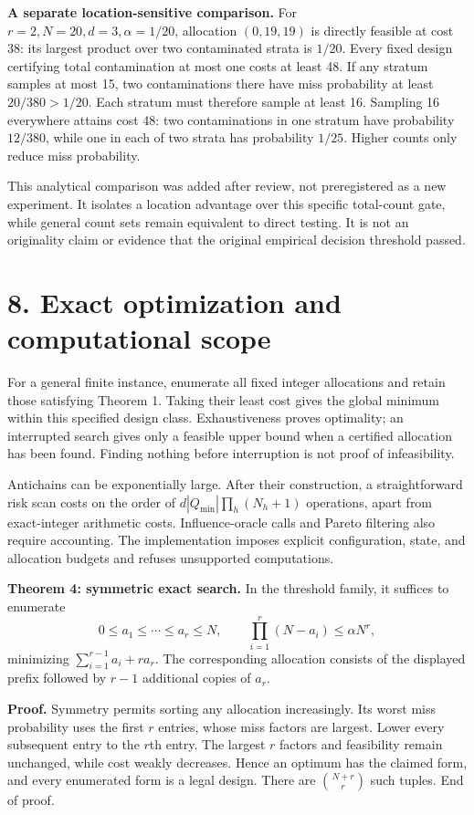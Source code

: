 \documentclass[11pt]{article}
\begin{document}
\textbf{A separate location-sensitive comparison.} For $r=2,N=20,d=3,\alpha=1/20$, allocation $(0,19,19)$ is directly feasible at cost 38: its largest product over two contaminated strata is $1/20$. Every fixed design certifying total contamination at most one costs at least 48. If any stratum samples at most 15, two contaminations there have miss probability at least $20/380>1/20$. Each stratum must therefore sample at least 16. Sampling 16 everywhere attains cost 48: two contaminations in one stratum have probability $12/380$, while one in each of two strata has probability $1/25$. Higher counts only reduce miss probability.

This analytical comparison was added after review, not preregistered as a new experiment. It isolates a location advantage over this specific total-count gate, while general count sets remain equivalent to direct testing. It is not an originality claim or evidence that the original empirical decision threshold passed.

\section*{8. Exact optimization and computational scope}

For a general finite instance, enumerate all fixed integer allocations and retain those satisfying Theorem 1. Taking their least cost gives the global minimum within this specified design class. Exhaustiveness proves optimality; an interrupted search gives only a feasible upper bound when a certified allocation has been found. Finding nothing before interruption is not proof of infeasibility.

Antichains can be exponentially large. After their construction, a straightforward risk scan costs on the order of $d|Q_{\min}|\prod_h(N_h+1)$ operations, apart from exact-integer arithmetic costs. Influence-oracle calls and Pareto filtering also require accounting. The implementation imposes explicit configuration, state, and allocation budgets and refuses unsupported computations.

\textbf{Theorem 4: symmetric exact search.} In the threshold family, it suffices to enumerate
\[
0\le a_1\le\cdots\le a_r\le N,\qquad
\prod_{i=1}^{r}(N-a_i)\le\alpha N^r,
\]
minimizing $\sum_{i=1}^{r-1}a_i+ra_r$. The corresponding allocation consists of the displayed prefix followed by $r-1$ additional copies of $a_r$.

\textbf{Proof.} Symmetry permits sorting any allocation increasingly. Its worst miss probability uses the first $r$ entries, whose miss factors are largest. Lower every subsequent entry to the $r$th entry. The largest $r$ factors and feasibility remain unchanged, while cost weakly decreases. Hence an optimum has the claimed form, and every enumerated form is a legal design. There are $\binom{N+r}{r}$ such tuples. End of proof.
\end{document}

